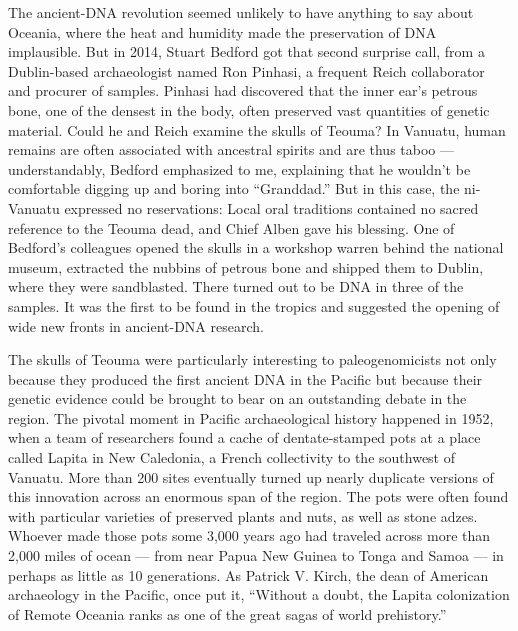 The ancient-DNA revolution seemed unlikely to have anything to say about
Oceania, where the heat and humidity made the preservation of DNA
implausible. But in 2014, Stuart Bedford got that second surprise call,
from a Dublin-based archaeologist named Ron Pinhasi, a frequent Reich
collaborator and procurer of samples. Pinhasi had discovered that the
inner ear's petrous bone, one of the densest in the body, often
preserved vast quantities of genetic material. Could he and Reich
examine the skulls of Teouma? In Vanuatu, human remains are often
associated with ancestral spirits and are thus taboo --- understandably,
Bedford emphasized to me, explaining that he wouldn't be comfortable
digging up and boring into ``Granddad.'' But in this case, the
ni-Vanuatu expressed no reservations: Local oral traditions contained no
sacred reference to the Teouma dead, and Chief Alben gave his blessing.
One of Bedford's colleagues opened the skulls in a workshop warren
behind the national museum, extracted the nubbins of petrous bone and
shipped them to Dublin, where they were sandblasted. There turned out to
be DNA in three of the samples. It was the first to be found in the
tropics and suggested the opening of wide new fronts in ancient-DNA
research.

The skulls of Teouma were particularly interesting to paleogenomicists
not only because they produced the first ancient DNA in the Pacific but
because their genetic evidence could be brought to bear on an
outstanding debate in the region. The pivotal moment in Pacific
archaeological history happened in 1952, when a team of researchers
found a cache of dentate-stamped pots at a place called Lapita in New
Caledonia, a French collectivity to the southwest of Vanuatu. More than
200 sites eventually turned up nearly duplicate versions of this
innovation across an enormous span of the region. The pots were often
found with particular varieties of preserved plants and nuts, as well as
stone adzes. Whoever made those pots some 3,000 years ago had traveled
across more than 2,000 miles of ocean --- from near Papua New Guinea to
Tonga and Samoa --- in perhaps as little as 10 generations. As Patrick
V. Kirch, the dean of American archaeology in the Pacific, once put it,
``Without a doubt, the Lapita colonization of Remote Oceania ranks as
one of the great sagas of world prehistory.''

